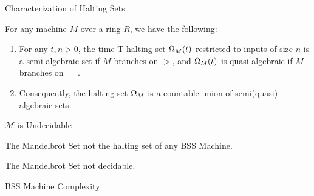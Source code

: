 \documentclass[c]{beamer}
\begin{document}
\begin{frame}{Characterization of Halting Sets}

  \begin{theorem}
    
    For any machine $M$ over a ring $R$, we have the following:

    \begin{enumerate}
    \item For any $t, n > 0$, the time-T halting set $\Omega_M(t)$
      restricted to inputs of size $n$ is a semi-algebraic set if $M$
      branches on $>$, and $\Omega_M(t)$ is quasi-algebraic if $M$
      branches on $=$.

    \item Consequently, the halting set $\Omega_M$ is a countable
      union of semi(quasi)-algebraic sets.
    \end{enumerate}
  \end{theorem}
\end{frame}

\begin{frame}{$\mathcal{M}$ is Undecidable}
  
  \begin{corollary}
    The Mandelbrot Set not the halting set of any BSS Machine.
  \end{corollary}

  \begin{corollary}
    The Mandelbrot Set not decidable.
  \end{corollary}
  
\end{frame}

\begin{frame}{BSS Machine Complexity}
  \begin{center}
  \end{center}
\end{frame}
\end{document}
